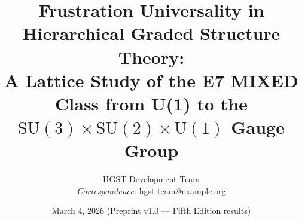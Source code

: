 \documentclass[12pt,a4paper]{article}
\theoremstyle{plain}
\theoremstyle{definition}
\theoremstyle{remark}
\begin{document}

\title{%
  \textbf{Frustration Universality in Hierarchical Graded Structure Theory:\\ 
  A Lattice Study of the E7 MIXED Class from U(1) to the $\mathrm{SU}(3){\times}\mathrm{SU}(2){\times}\mathrm{U}(1)$ Gauge Group}
}

\author{%
  HGST Development Team\\[4pt]
  \small\textit{Correspondence:} \href{mailto:hgst-team@example.org}{hgst-team@example.org}
}

\date{March 4, 2026 \quad
      {\normalsize(Preprint v1.0 --- Fifth Edition results)}}

\maketitle
\thispagestyle{empty}
\end{document}
